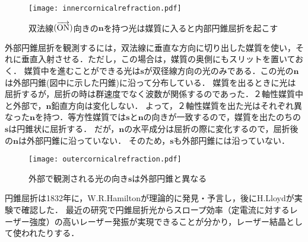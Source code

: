 \begin{figure}[ht]
  \centering
  \texttt{[image: innercornicalrefraction.pdf]}
  \caption{双法線$(\protect\overrightarrow{\text{ON}})$向きの$\boldsymbol{n}$を持つ光は媒質に入ると内部円錐屈折を起こす}
  \label{innercornicalrefraction}
\end{figure}

外部円錐屈折を観測するには，双法線に垂直な方向に切り出した媒質を使い，それに垂直入射させる．ただし，この場合は，媒質の奥側にもスリットを置いておく．
媒質中を進むことができる光は$\boldsymbol{s}$が双径線方向の光のみである．この光の$\boldsymbol{n}$は外部円錐(図中に示した円錐)に沿って分布している．
媒質を出るときに光は屈折するが，屈折の時は群速度でなく波数が関係するのであった．２軸性媒質中と外部で，$\boldsymbol{n}$鉛直方向は変化しない．
よって，２軸性媒質を出た光はそれぞれ異なった$\boldsymbol{n}$を持つ．等方性媒質では$\boldsymbol{s}$と$\boldsymbol{n}$の向きが一致するので，媒質を出たのちの$\boldsymbol{s}$は円錐状に屈折する．
だが，$\boldsymbol{n}$の水平成分は屈折の際に変化するので，屈折後の$\boldsymbol{n}$は外部円錐に沿っていない．
そのため，$\boldsymbol{s}$も外部円錐には沿っていない．

\begin{figure}[ht]
  \centering
  \texttt{[image: outercornicalrefraction.pdf]}
  \caption{外部で観測される光の向き$\boldsymbol{s}$は外部円錐と異なる}
  \label{outercornicalrefraction}
\end{figure}

円錐屈折は1832年に，W.R.Hamiltonが理論的に発見・予言し，後にH.Lloydが実験で確認した．
最近の研究で円錐屈折光からスロープ効率（定電流に対するレーザー強度）の高いレーザー発振が実現できることが分かり，レーザー結晶として使われたりする．
